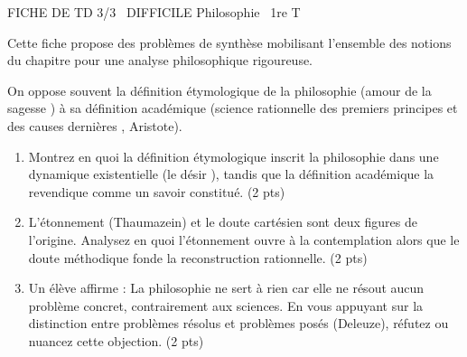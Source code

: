 \documentclass[11pt]{article}
\begin{document}
\begin{tcolorbox}[enhanced,colback=popink,colframe=popink,arc=10pt,boxrule=0pt,left=12pt,right=12pt,top=9pt,bottom=9pt]
{\color{white}\popxbold\small FICHE DE TD 3/3 \textbullet\ DIFFICILE \hfill Philosophie \textbullet\ 1re T\par}
\end{tcolorbox}
\vspace{4pt}
Cette fiche propose des problèmes de synthèse mobilisant l'ensemble des notions du chapitre pour une analyse philosophique rigoureuse.

\begin{exercice}
On oppose souvent la définition étymologique de la philosophie (\og amour de la sagesse \fg) à sa définition académique (\og science rationnelle des premiers principes et des causes dernières \fg, Aristote).
\begin{enumerate}
    \item Montrez en quoi la définition étymologique inscrit la philosophie dans une dynamique existentielle (le \og désir \fg), tandis que la définition académique la revendique comme un savoir constitué. (2 pts)
    \item L'étonnement (Thaumazein) et le doute cartésien sont deux figures de l'origine. Analysez en quoi l'étonnement ouvre à la contemplation alors que le doute méthodique fonde la reconstruction rationnelle. (2 pts)
    \item Un élève affirme : \og La philosophie ne sert à rien car elle ne résout aucun problème concret, contrairement aux sciences. \fg En vous appuyant sur la distinction entre \og problèmes résolus \fg et \og problèmes posés \fg (Deleuze), réfutez ou nuancez cette objection. (2 pts)
\end{enumerate}
\end{exercice}
\end{document}
